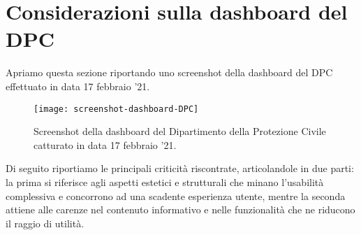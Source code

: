 \documentclass[../../main.tex]{subfiles}
\begin{document}
\section{Considerazioni sulla dashboard del DPC}\label{s:considerazioni}
Apriamo questa sezione riportando uno screenshot della dashboard del DPC effettuato in data 17 febbraio '21.

\begin{figure}[h]
    \centering
    \texttt{[image: screenshot-dashboard-DPC]}
    \caption{Screenshot della dashboard del Dipartimento della Protezione Civile catturato in data 17 febbraio '21.}
    \label{fig:screen-dashboard-DPC}
\end{figure}

Di seguito riportiamo le principali criticità riscontrate, articolandole in due parti: la prima si riferisce agli aspetti estetici e strutturali che minano l'usabilità complessiva e concorrono ad una scadente esperienza utente, mentre la seconda attiene alle carenze nel contenuto informativo e nelle funzionalità che ne riducono il raggio di utilità.
\end{document}

